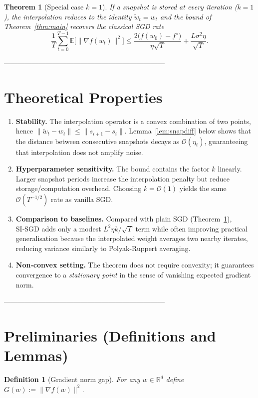 \documentclass{article}
\newtheorem{theorem}{Theorem}
\newtheorem{definition}{Definition}
\newcommand{\E}{\mathbb{E}}
\newcommand{\R}{\mathbb{R}}
\begin{document}
\begin{theorem}[Special case $k=1$]\label{thm:k1}
If a snapshot is stored at every iteration ($k=1$), the interpolation reduces to the identity $\tilde w_t=w_t$ and the bound of Theorem~\ref{thm:main} recovers the classical SGD rate
\[
\frac{1}{T}\sum_{t=0}^{T-1}\E\big[\|\nabla f(w_t)\|^{2}\big]\le
\frac{2\big(f(w_0)-f^\star\big)}{\eta\sqrt{T}}+\frac{L\sigma^{2}\eta}{\sqrt{T}} .
\]
\end{theorem}

---------------------------------------------------------------------

\section*{Theoretical Properties}
\begin{enumerate}[label=\arabic*.]
\item \textbf{Stability.} The interpolation operator is a convex combination of two points, hence $\|\tilde w_t-w_t\|\le\|s_{i+1}-s_i\|$. Lemma~\ref{lem:snapdiff} below shows that the distance between consecutive snapshots decays as $\mathcal{O}(\eta_t)$, guaranteeing that interpolation does not amplify noise.

\item \textbf{Hyperparameter sensitivity.} The bound contains the factor $k$ linearly. Larger snapshot periods increase the interpolation penalty but reduce storage/computation overhead. Choosing $k=\mathcal{O}(1)$ yields the same $\mathcal{O}(T^{-1/2})$ rate as vanilla SGD.

\item \textbf{Comparison to baselines.} Compared with plain SGD (Theorem~\ref{thm:k1}), SI‑SGD adds only a modest $L^{2}\eta k/\sqrt{T}$ term while often improving practical generalisation because the interpolated weight averages two nearby iterates, reducing variance similarly to Polyak‑Ruppert averaging.

\item \textbf{Non‑convex setting.} The theorem does not require convexity; it guarantees convergence to a \emph{stationary point} in the sense of vanishing expected gradient norm.
\end{enumerate}

---------------------------------------------------------------------

\section*{Preliminaries (Definitions and Lemmas)}
\begin{definition}[Gradient norm gap]
For any $w\in\R^{d}$ define $G(w):=\|\nabla f(w)\|^{2}$.
\end{definition}
\end{document}
